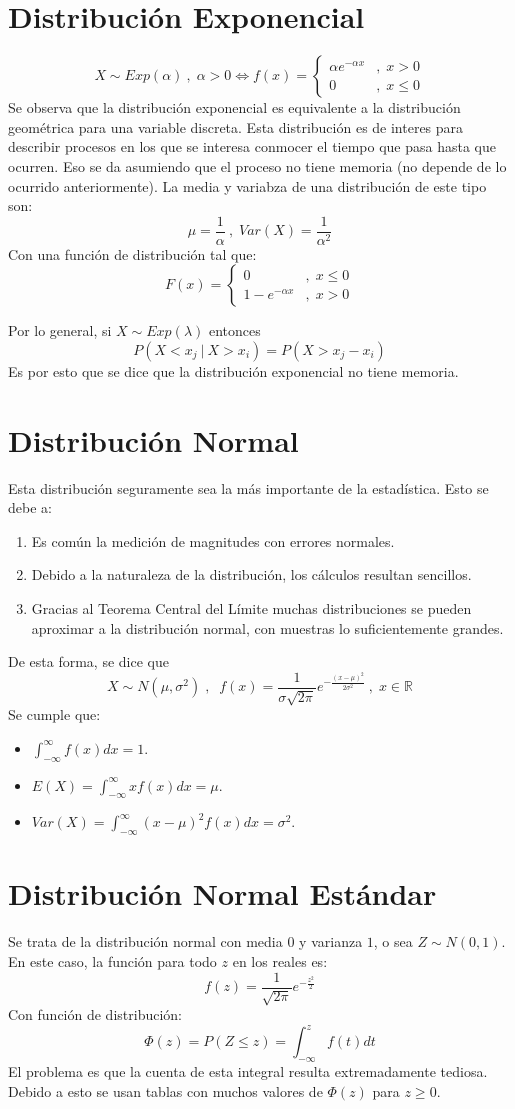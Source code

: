 \documentclass[10pt,a4paper]{book}
\begin{document}
\section{Distribución Exponencial}
\[X\sim Exp(\alpha)\:,\;\alpha > 0\iff f(x)=
		\left\{\begin{array}{cl}
				\alpha e^{-\alpha x} &,\;x>0\\
				0 & ,\; x\leq 0
				\end{array}\right.\]
Se observa que la distribución exponencial es equivalente a la distribución
geométrica para una variable discreta. Esta distribución es de interes para describir procesos en los que se interesa conmocer el tiempo que pasa hasta que ocurren. Eso se da asumiendo que el proceso no tiene memoria (no depende de lo ocurrido anteriormente). La media y variabza de una distribución de este tipo son:
\[\mu = \frac 1{\alpha} \:,\; Var(X) = \frac 1{\alpha^2}\]
Con una función de distribución tal que:
\[F(x) = 
	\left\{\begin{array}{cc}
		0  &,\; x\leq 0 \\
		1-e^{-\alpha x} &,\; x> 0
	\end{array}\right.
\]

Por lo general, si $X\sim Exp(\lambda)$ entonces
\[ P(X<x_j\:|\: X>x_i) = P(X>x_j-x_i)\]
Es por esto que se dice que la distribución exponencial no tiene memoria.	
\section{Distribución Normal}
Esta distribución seguramente sea la más importante de la estadística. Esto se debe a:
\begin{enumerate}
	\item Es común la medición de magnitudes con errores normales.
	\item Debido a la naturaleza de la distribución, los cálculos resultan sencillos.
	\item Gracias al Teorema Central del Límite muchas distribuciones se pueden aproximar a la distribución normal, con muestras lo suficientemente grandes.
\end{enumerate}
De esta forma, se dice que 
\[X\sim N(\mu,\sigma^2)\;,\;\; f(x) = \frac{1}{\sigma\sqrt{2\pi}} e^{-\frac{(x-\mu)^2}{2\sigma^2}}\:,\; x\in\mathbb{R}\]
Se cumple que:
\begin{itemize}
	\item $\int_{-\infty}^\infty f(x)dx = 1$.
	\item $E(X) = \int_{-\infty}^\infty xf(x)dx = \mu$.
	\item $Var(X) = \int_{-\infty}^\infty (x-\mu)^2f(x)dx = \sigma^2$.
\end{itemize}
\section{Distribución Normal Estándar}
Se trata de la distribución normal con media $0$ y varianza $1$, o sea $Z\sim N(0,1) $. En este caso, la función para todo $z$ en los reales es:
\[f(z) = \frac 1{\sqrt{2\pi}}e^{-\frac{z^2}{2}}\]
Con función de distribución:
\[\Phi(z) = P(Z\leq z) = \int_{-\infty}^zf(t)dt\]
El problema es que la cuenta de esta integral resulta extremadamente tediosa. Debido a esto se usan tablas con muchos valores de $\Phi(z)$ para $z\geq 0$.
\end{document}
